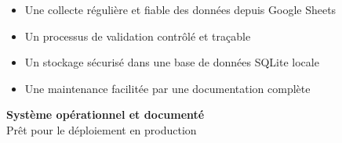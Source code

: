 \documentclass[11pt,a4paper]{article}
\begin{document}
\begin{itemize}
    \item Une collecte régulière et fiable des données depuis Google Sheets
    \item Un processus de validation contrôlé et traçable
    \item Un stockage sécurisé dans une base de données SQLite locale
    \item Une maintenance facilitée par une documentation complète
\end{itemize}

\vspace{1cm}
\begin{center}
     \textbf{Système opérationnel et documenté} \\
    \small Prêt pour le déploiement en production
\end{center}
\end{document}
